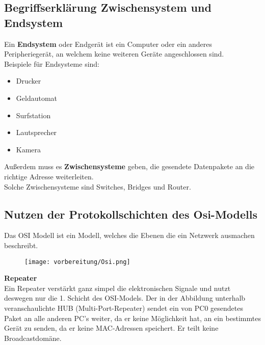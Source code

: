 \subsection{Begriffserklärung Zwischensystem und Endsystem}

    Ein \textbf{Endsystem} oder Endgerät ist ein Computer oder ein anderes Peripheriegerät, an welchem keine weiteren Geräte angeschlossen sind. \\
    Beispiele für Endsysteme sind:
    \begin{itemize}
        \item Drucker
        \item Geldautomat
        \item Surfstation
        \item Lautsprecher
        \item Kamera
    \end{itemize}
    \vspace{0cm}
    Außerdem muss es \textbf{Zwischensysteme} geben, die gesendete Datenpakete an die richtige Adresse weiterleiten. \\
    Solche Zwischensysteme sind Switches, Bridges und Router. 


\subsection{Nutzen der Protokollschichten des Osi-Modells}

    Das OSI Modell ist ein Modell, welches die Ebenen die ein Netzwerk ausmachen beschreibt.

    

    \begin{figure}[ht]
        \centering
        \texttt{[image: vorbereitung/Osi.png]}
    \end{figure}
    \vspace{0cm}
    \textbf{Repeater}
    \\
    Ein Repeater verstärkt ganz simpel die elektronischen Signale und nutzt deswegen nur die 1. Schicht des OSI-Models. Der in der Abbildung unterhalb veranschaulichte HUB (Multi-Port-Repeater) sendet ein von PC0 gesendetes Paket an alle anderen PC’s weiter, da er keine Möglichkeit hat, an ein bestimmtes Gerät zu senden, da er keine MAC-Adressen speichert. Er teilt keine Broadcastdomäne.\\


